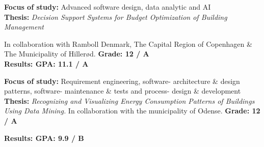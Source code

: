 

\textbf{Focus of study:} Advanced software design, data analytic and AI \\
\textbf{Thesis:} \emph{Decision Support Systems for Budget Optimization of Building Management}

In collaboration with Ramboll Denmark, The Capital Region of Copenhagen \& The Municipality of Hillerød. \textbf{Grade: 12 / A}\\
\textbf{Results: GPA: 11.1 / A}

\divider

\textbf{Focus of study:} Requirement engineering, software- architecture \& design patterns, software- maintenance \& tests and process- design \& development\\
\textbf{Thesis:} \emph{Recognizing and Visualizing Energy Consumption Patterns of Buildings Using Data Mining.} In collaboration with the municipality of Odense. \textbf{Grade: 12 / A} 

\textbf{Results: GPA: 9.9 / B}
